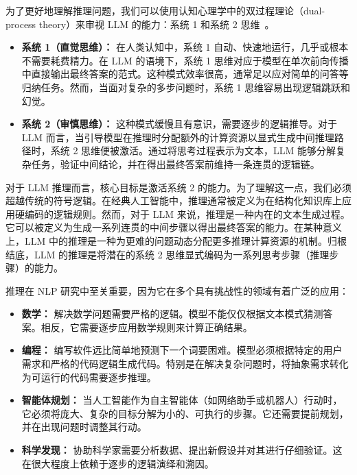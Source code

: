 为了更好地理解推理问题，我们可以使用认知心理学中的双过程理论（dual-process theory）来审视 LLM 的能力：系统 1 和系统 2 思维~\cite{kahneman:2011thinking}。

\begin{itemize}
\item \vspace{0.5cm} \textbf{系统 1（直觉思维）：} 在人类认知中，系统 1 自动、快速地运行，几乎或根本不需要耗费精力。在 LLM 的语境下，系统 1 思维对应于模型在单次前向传播中直接输出最终答案的范式。这种模式效率很高，通常足以应对简单的问答等归纳任务。然而，当面对复杂的多步问题时，系统 1 思维容易出现逻辑跳跃和幻觉。
\item \vspace{0.3cm} \textbf{系统 2（审慎思维）：} 这种模式缓慢且有意识，需要逐步的逻辑推导。对于 LLM 而言，当引导模型在推理时分配额外的计算资源以显式生成中间推理路径时，系统 2 思维便被激活。通过将思考过程表示为文本，LLM 能够分解复杂任务，验证中间结论，并在得出最终答案前维持一条连贯的逻辑链。
\end{itemize}
\vspace{0.3cm}

对于 LLM 推理而言，核心目标是激活系统 2 的能力。为了理解这一点，我们必须超越传统的符号逻辑。在经典人工智能中，推理通常被定义为在结构化知识库上应用硬编码的逻辑规则。然而，对于 LLM 来说，推理是一种内在的文本生成过程。它可以被定义为生成一系列连贯的中间步骤以得出最终答案的能力。在某种意义上，LLM 中的推理是一种为更难的问题动态分配更多推理计算资源的机制。归根结底，LLM 的推理是将潜在的系统 2 思维显式编码为一系列思考步骤（推理步骤）的能力。

推理在 NLP 研究中至关重要，因为它在多个具有挑战性的领域有着广泛的应用：

\begin{itemize}
\item \vspace{0.2cm} \textbf{数学：} 解决数学问题需要严格的逻辑。模型不能仅仅根据文本模式猜测答案。相反，它需要逐步应用数学规则来计算正确结果。
\item \vspace{0.2cm} \textbf{编程：} 编写软件远比简单地预测下一个词要困难。模型必须根据特定的用户需求和严格的代码逻辑生成代码。特别是在解决复杂问题时，将抽象需求转化为可运行的代码需要逐步推理。
\item \vspace{0.2cm} \textbf{智能体规划：} 当人工智能作为自主智能体（如网络助手或机器人）行动时，它必须将庞大、复杂的目标分解为小的、可执行的步骤。它还需要提前规划，并在出现问题时调整其行动。
\item \vspace{0.2cm} \textbf{科学发现：} 协助科学家需要分析数据、提出新假设并对其进行仔细验证。这在很大程度上依赖于逐步的逻辑演绎和溯因。
\end{itemize}
\vspace{0.3cm}

